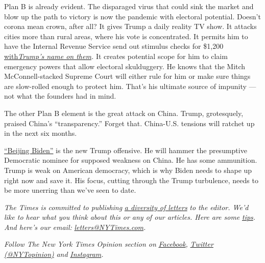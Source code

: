 Plan B is already evident. The disparaged virus that could sink the
market and blow up the path to victory is now the pandemic with
electoral potential. Doesn't corona mean crown, after all? It gives
Trump a daily reality TV show. It attacks cities more than rural areas,
where his vote is concentrated. It permits him to have the Internal
Revenue Service send out stimulus checks for \$1,200
\href{https://www.washingtonpost.com/politics/coming-to-your-1200-relief-check-donald-j-trumps-name/2020/04/14/071016c2-7e82-11ea-8013-1b6da0e4a2b7_story.html}{with}\href{https://www.washingtonpost.com/politics/coming-to-your-1200-relief-check-donald-j-trumps-name/2020/04/14/071016c2-7e82-11ea-8013-1b6da0e4a2b7_story.html}{\emph{Trump's
name on them}}\emph{.} It creates potential scope for him to claim
emergency powers that allow electoral skulduggery. He knows that the
Mitch McConnell-stacked Supreme Court will either rule for him or make
sure things are slow-rolled enough to protect him. That's his ultimate
source of impunity --- not what the founders had in mind.

The other Plan B element is the great attack on China. Trump,
grotesquely, praised China's ``transparency.'' Forget that. China-U.S.
tensions will ratchet up in the next six months.

\href{https://www.axios.com/biggest-trump-super-pac-test-drives-beijingbiden-campaign-75582a64-6edc-48ec-9b38-f307816b6a32.html}{``Beijing
Biden''} is the new Trump offensive. He will hammer the presumptive
Democratic nominee for supposed weakness on China. He has some
ammunition. Trump is weak on American democracy, which is why Biden
needs to shape up right now and save it. His focus, cutting through the
Trump turbulence, needs to be more unerring than we've seen to date.

\emph{The Times is committed to publishing}
\href{https://www.nytimes3xbfgragh.onion/2019/01/31/opinion/letters/letters-to-editor-new-york-times-women.html}{\emph{a
diversity of letters}} \emph{to the editor. We'd like to hear what you
think about this or any of our articles. Here are some}
\href{https://help.nytimes3xbfgragh.onion/hc/en-us/articles/115014925288-How-to-submit-a-letter-to-the-editor}{\emph{tips}}\emph{.
And here's our email:}
\href{mailto:letters@NYTimes.com}{\emph{letters@NYTimes.com}}\emph{.}

\emph{Follow The New York Times Opinion section on}
\href{https://www.facebookcorewwwi.onion/nytopinion}{\emph{Facebook}}\emph{,}
\href{http://twitter.com/NYTOpinion}{\emph{Twitter (@NYTopinion)}}
\emph{and}
\href{https://www.instagram.com/nytopinion/}{\emph{Instagram}}\emph{.}


